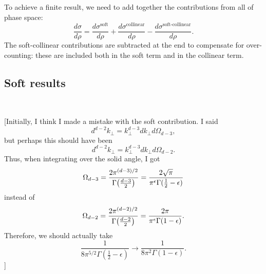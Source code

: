 \documentclass[11pt,twoside,reqno]{amsart}
\theoremstyle{plain}
\theoremstyle{remark}
\theoremstyle{definition}
\theoremstyle{remark}
\theoremstyle{definition}
\theoremstyle{definition}
\begin{document}
	To achieve a finite result, we need to add together the contributions from all of phase space:
	\begin{equation}
		\frac{d\sigma}{d\rho} = \frac{d\sigma^\text{soft}}{d\rho} + \frac{d\sigma^\text{collinear}}{d\rho} - \frac{d\sigma^\text{soft-collinear}}{d\rho}.
	\end{equation}
	The soft-collinear contributions are subtracted at the end to compensate for over-counting: these are included both in the soft term and in the collinear term.

\subsection{Soft results}
	{\color{black}\,}

	{\color{red}[Initially, I think I made a mistake with the soft contribution. I said 
	\begin{equation}
		d^{d-2}k_\perp = k_\perp^{d-3} dk_\perp d\Omega_{d-3},
	\end{equation}
	but perhaps this should have been
	\begin{equation}
		d^{d-2}k_\perp = k_\perp^{d-3} dk_\perp d\Omega_{d-2}.
	\end{equation}
	Thus, when integrating over the solid angle, I got
	\begin{equation}
		\Omega_{d-3} = \frac{2\pi^{(d-3)/2}}{\Gamma\qty(\frac{d - 3}{2})} = \frac{2\sqrt{\pi}}{\pi^\epsilon \Gamma(\frac{1}{2} - \epsilon)}
	\end{equation}
	instead of 
	\begin{equation}
		\Omega_{d-2} = \frac{2\pi^{(d-2)/2}}{\Gamma\qty(\frac{d - 2}{2})} = \frac{2\pi}{\pi^\epsilon \Gamma(1 - \epsilon)}.
	\end{equation}
	Therefore, we should actually take
	\begin{equation}
		\frac{1}{8\pi^{5/2}\Gamma(\frac{1}{2} - \epsilon)} \to \frac{1}{8\pi^2 \Gamma(1 - \epsilon)}.
	\end{equation}
	]}
\end{document}
